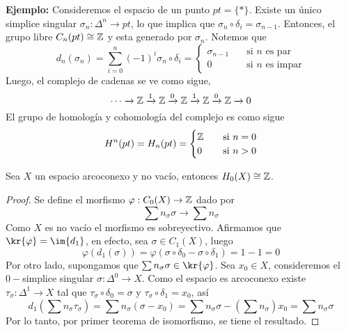 \documentclass{article}
\begin{document}
\vspace{2mm}
\noindent\textbf{Ejemplo: } Consideremos el espacio de un punto $pt=\{*\}$. Existe un único 
simplice singular $\sigma_{n}:\Delta^{n}\to pt$, lo que implica que $\sigma_{n}\circ\delta_{i}
=\sigma_{n-1}$. Entonces, el grupo libre $C_{n}(pt)\cong\mathbb{Z}$ y esta generado por $\sigma_{n}$.
Notemos que
\begin{equation*}
    d_{n}(\sigma_{n})=\sum_{i=0}^{n}(-1)^{i}\sigma_{n}\circ\delta_{i}=\begin{cases}
        \sigma_{n-1} &\quad\text{si }n\text{ es par} \\
        0 &\quad\text{si }n\text{ es impar}
    \end{cases}
\end{equation*}
Luego, el complejo de cadenas se ve como sigue,
\begin{equation*}
    \cdots\xrightarrow[]{}\mathbb{Z}\xrightarrow[]{1}\mathbb{Z}\xrightarrow[]{0}\mathbb{Z}\xrightarrow[]{1}\mathbb{Z}
    \xrightarrow[]{0}\mathbb{Z}\xrightarrow[]{}0
\end{equation*}
El grupo de homología y cohomología del complejo es como sigue
\begin{equation*}
    H^{n}(pt)=H_{n}(pt)=\begin{cases}
        \mathbb{Z} & \quad\text{si }n=0 \\
        0 & \quad\text{si }n>0
    \end{cases}
\end{equation*}

\vspace{2mm}
\begin{lema}
    Sea $X$ un espacio arcoconexo y no vacío, entonces $H_{0}(X)\cong\mathbb{Z}$.
\end{lema}
\begin{proof}
    Se define el morfismo $\varphi: C_{0}(X)\to\mathbb{Z}$ dado por
    \begin{equation*}
        \sum n_{\sigma}\sigma\to\sum n_{\sigma}
    \end{equation*}
    Como $X$ es no vacío el morfismo es sobreyectivo. Afirmamos que $\kr{\varphi}=\im{d_{1}}$, en
    efecto, sea $\sigma\in C_{1}(X)$, luego
    \begin{equation*}
        \varphi(d_{1}(\sigma))=\varphi(\sigma\circ\delta_{0}-\sigma\circ\delta_{1})=1-1=0
    \end{equation*}
    Por otro lado, supongamos que $\sum n_{\sigma}\sigma\in\kr{\varphi}$. Sea $x_{0}\in X$, 
    consideremos el $0-$simplice singular $\sigma:\Delta^{0}\to X$. Como el espacio es arcoconexo
    existe $\tau_{\sigma}:\Delta^{1}\to X$ tal que $\tau_{\sigma}\circ\delta_{0}=\sigma$ y 
    $\tau_{\sigma}\circ\delta_{1}=x_{0}$, así
    \begin{equation*}
        d_{1}\left(\sum n_{\sigma}\tau_{\sigma}\right)=\sum n_{\sigma}(\sigma-x_{0})
        =\sum n_{\sigma}\sigma-\left(\sum n_{\sigma}\right)x_{0}=\sum n_{\sigma}\sigma
    \end{equation*}
    Por lo tanto, por primer teorema de isomorfismo, se tiene el resultado.
\end{proof}
\end{document}
